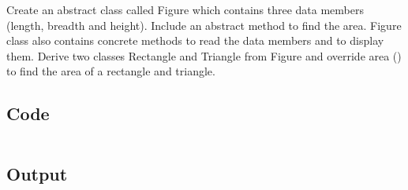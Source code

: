 \documentclass[../main.tex]{subfiles}
\begin{document}
Create an abstract class called Figure which contains three data members
(length, breadth and height). Include an abstract method to find the area.
Figure class also contains concrete methods to read the data members and to
display them. Derive two classes Rectangle and Triangle from Figure and
override area () to find the area of a rectangle and triangle.

\subsection{Code}
\inputminted[frame=lines, breaklines, breakanywhere, numberblanklines=false]{java}{./programs/prog5/Main.java}

\subsection{Output}
\end{document}
